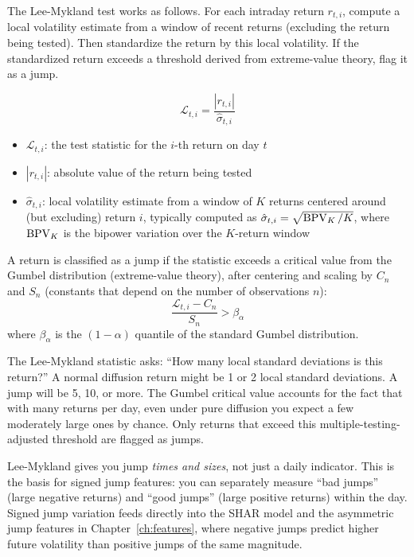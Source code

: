 The Lee-Mykland test works as follows.
For each intraday return $r_{t,i}$, compute a local volatility estimate from a window of recent returns (excluding the return being tested).
Then standardize the return by this local volatility.
If the standardized return exceeds a threshold derived from extreme-value theory, flag it as a jump.

\begin{definition}
\begin{equation}
  \mathcal{L}_{t,i} = \frac{|r_{t,i}|}{\hat{\sigma}_{t,i}}
  \label{eq:lm-stat}
\end{equation}
\begin{itemize}[nosep]
  \item $\mathcal{L}_{t,i}$: the test statistic for the $i$-th return on day $t$
  \item $|r_{t,i}|$: absolute value of the return being tested
  \item $\hat{\sigma}_{t,i}$: local volatility estimate from a window of $K$ returns centered around (but excluding) return $i$, typically computed as $\hat{\sigma}_{t,i} = \sqrt{\operatorname{BPV}_K / K}$, where $\operatorname{BPV}_K$ is the bipower variation over the $K$-return window
\end{itemize}
A return is classified as a jump if the statistic exceeds a critical value from the Gumbel distribution (extreme-value theory), after centering and scaling by $C_n$ and $S_n$ (constants that depend on the number of observations $n$):
\begin{equation}
  \frac{\mathcal{L}_{t,i} - C_n}{S_n} > \beta_\alpha
  \label{eq:lm-rejection}
\end{equation}
where $\beta_\alpha$ is the $(1-\alpha)$ quantile of the standard Gumbel distribution.

\begin{intuition}
The Lee-Mykland statistic asks: ``How many local standard deviations is this return?''
A normal diffusion return might be 1 or 2 local standard deviations.
A jump will be 5, 10, or more.
The Gumbel critical value accounts for the fact that with many returns per day, even under pure diffusion you expect a few moderately large ones by chance.
Only returns that exceed this multiple-testing-adjusted threshold are flagged as jumps.
\end{intuition}
\end{definition}

\begin{projectconnection}
Lee-Mykland gives you jump \emph{times and sizes}, not just a daily indicator.
This is the basis for signed jump features: you can separately measure ``bad jumps'' (large negative returns) and ``good jumps'' (large positive returns) within the day.
Signed jump variation feeds directly into the SHAR model and the asymmetric jump features in Chapter~\ref{ch:features}, where negative jumps predict higher future volatility than positive jumps of the same magnitude.
\end{projectconnection}

